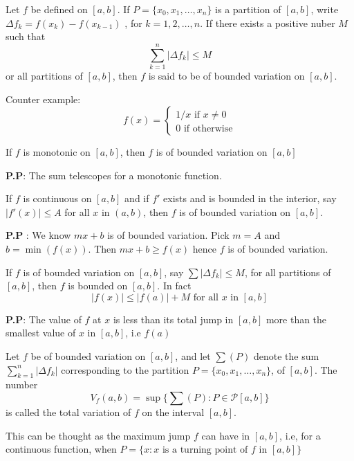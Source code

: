 \documentclass[10pt,a4paper]{book}
\begin{document}
\begin{deff}
Let $f$ be defined on $[a, b]$. If $P = \{x_0, x_1, \dots , x_n\}$ is a partition of $[a, b]$, write $\Delta f_k = f(x_k) - f(x_{k- 1})$ , for $k = 1, 2, \dots , n$. If there exists a
positive nuber $M$ such that
$$\sum_{k=1}^n|\Delta f_k| \leq M$$
or all partitions of $[a, b]$, then $f$ is said to be of bounded variation on $[a, b]$.
\end{deff}
Counter example:
$$f(x) = 
\begin{cases}
1/x \text{ if } x \neq 0\\
0 \text{ if otherwise}
\end{cases}$$

\begin{Thm}
If $f$ is monotonic on $[a, b]$, then $f$ is of bounded variation on $[a, b]$
\end{Thm}
\noindent \textbf{P.P}: The sum telescopes for a monotonic function.
\begin{Thm}
 If $f$ is continuous on $[a, b]$ and if $f'$ exists and is bounded in the interior, say $|f'(x)| \leq A$ for all $x$ in $(a, b)$, then $f$ is of bounded variation on $[a, b]$.
\end{Thm}
\noindent \textbf{P.P} : We know $mx + b$ is of bounded variation. Pick $m = A$ and $b = \min(f(x))$. Then $mx + b \geq f(x)$ hence $f$ is of bounded variation.


\begin{Thm}
If $f$ is of bounded variation on $[a, b]$, say $\sum |\Delta f_k| \leq M$,  for all partitions of $[a, b]$, then $f$ is bounded on $[a, b]$. In fact
$$|f(x)| \leq |f(a)| + M \text{    for all $x$ in $[a,b]$}$$
\end{Thm}
\noindent \textbf{P.P}: The value of $f$ at $x$ is less than its total jump in $[a,b]$ more than the smallest value of $x$ in $[a,b]$, i.e $f(a)$

\begin{deff}
Let $f$ be of bounded variation on $[a, b]$, and let $\sum (P)$ denote the sum
 $\sum_{k=1}^n |\Delta f_k|$ corresponding to the partition $P = \{x_0, x_1, \dots , x_n\}$, of $[a, b]$. The number
   $$V_f(a,b)= \sup\big\{\sum (P): P \in \mathcal{P}[a,b]\big\}$$
  is called the total variation of $f$ on the interval $[a,b]$.

\end{deff}
 This can be thought as the maximum jump $f$ can have in $[a,b]$, i.e, for a continuous function, when $P = \{x: x\text{ is a turning point of } f \text{ in } [a,b] \}$
 
\end{document}
